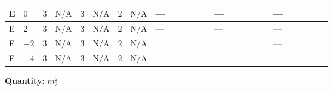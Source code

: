 \documentclass[8pt]{article}
\begin{document}
\begin{landscape}
\begin{longtable}{@{}llcccccc >{\raggedright\arraybackslash}p{0.21\linewidth} >{\raggedright\arraybackslash}p{0.21\linewidth} >{\raggedright\arraybackslash}p{0.21\linewidth}@{}}
\midrule
E & $0$ & $3$ & $\text{N/A}$ & $3$ & $\text{N/A}$ & $2$ & $\text{N/A}$ & --- & --- & --- \\
\midrule
E & $2$ & $3$ & $\text{N/A}$ & $3$ & $\text{N/A}$ & $2$ & $\text{N/A}$ & --- & --- & --- \\
\midrule
E & $-2$ & $3$ & $\text{N/A}$ & $3$ & $\text{N/A}$ & $2$ & $\text{N/A}$ & \scriptsize\adjustbox{max width=\linewidth}{$\begin{gathered} 20 {\mu_{\mathrm{T3GeneralS2Sq}}} \left({\lambda_{X_{2}}}\right)^{*}\end{gathered}$} & \scriptsize\adjustbox{max width=\linewidth}{$\begin{gathered} +20 {\lambda_{X_{2}}} \left({\mu_{\mathrm{T3GeneralS2Sq}}}\right)^{*}\end{gathered}$} & --- \\
\midrule
E & $-4$ & $3$ & $\text{N/A}$ & $3$ & $\text{N/A}$ & $2$ & $\text{N/A}$ & --- & --- & --- \\
\midrule
\bottomrule
\end{longtable}
\clearpage
\noindent\textbf{Quantity: }$m_2^2$\par\smallskip

\end{landscape}
\end{document}
